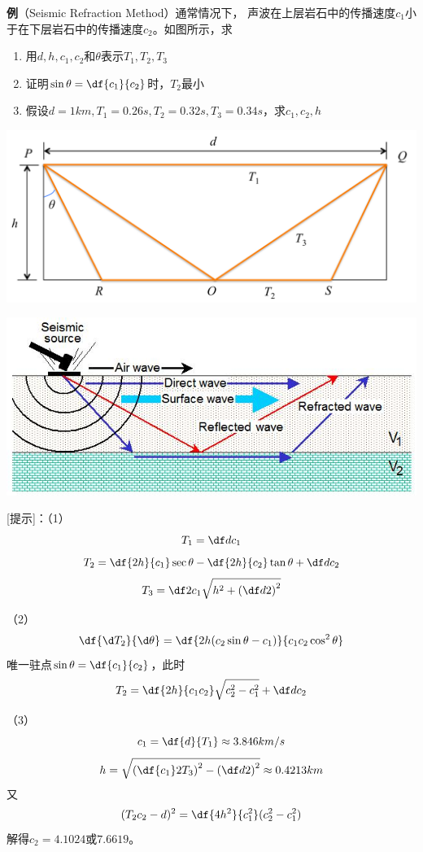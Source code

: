 {\bf 例}（Seismic Refraction Method）通常情况下，
声波在上层岩石中的传播速度$c_1$小于在下层岩石中的传播速度$c_2$。如图所示，求
\begin{enumerate}[(1)]
  \setlength{\itemindent}{1cm}
  \item 用$d,h,c_1,c_2$和$\theta$表示$T_1,T_2,T_3$
  \item 证明$\sin\theta=\df{c_1}{c_2}$时，$T_2$最小
  \item 假设$d=1km,T_1=0.26s,T_2=0.32s,T_3=0.34s$，求$c_1,c_2,h$
\end{enumerate}
\begin{center}
	\includegraphics[width=.6\textwidth]{./images/ch5/eWave.pdf}
	
	\includegraphics[width=.6\textwidth]{./images/ch3/RS-structure.jpg}
\end{center}

[提示]：（1）
$$T_1=\df d{c_1}$$
$$T_2=\df{2h}{c_1}\sec\theta-\df{2h}{c_2}\tan\theta+\df d{c_2}$$
$$T_3=\df2{c_1}\sqrt{h^2+\left(\df d2\right)^2}$$


（2）
$$\df{\d T_2}{\d\theta}=\df{2h(c_2\sin\theta-c_1)}{c_1c_2\cos^2\theta}$$
唯一驻点$\sin\theta=\df{c_1}{c_2}$，此时
$$T_2=\df{2h}{c_1c_2}\sqrt{c_2^2-c_1^2}+\df d{c_2}$$

（3）
$$c_1=\df{d}{T_1}\approx3.846km/s$$
$$h=\sqrt{\left(\df{c_1}2T_3\right)^2-\left(\df d2\right)^2}\approx0.4213km$$
又
$$(T_2c_2-d)^2=\df{4h^2}{c_1^2}(c_2^2-c_1^2)$$
解得$c_2=4.1024$或$7.6619$。

